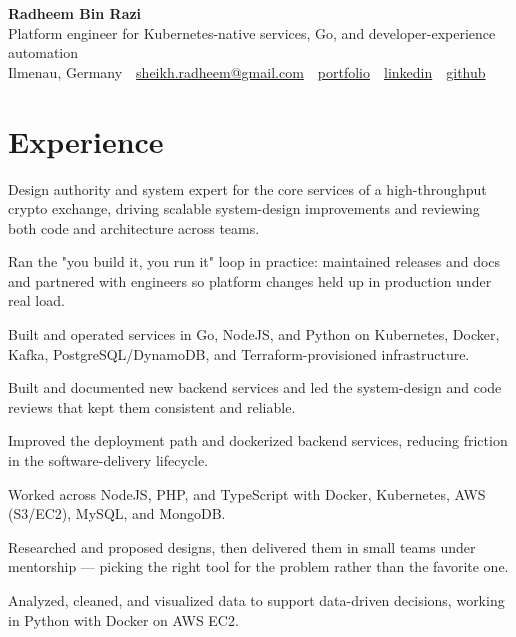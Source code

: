 \documentclass[11pt,a4paper]{resume}
\makeatletter
\newcommand{\Portfolio}{https://radheem.github.io/my-cv}
\newcommand{\PortfolioText}{portfolio}
\newcommand{\GitHub}{https://github.com/radheem}
\newcommand{\LinkedIn}{https://www.linkedin.com/in/radheem-razi}
\newcommand{\Email}{sheikh.radheem@gmail.com}
\makeatother
\begin{document}
\begin{center}
  {\huge\bfseries Radheem Bin Razi}\\[3pt]
  {\large Platform engineer for Kubernetes-native services, Go, and developer-experience automation}\\[6pt]
  \small
  Ilmenau, Germany \,\textbar\,
  \href{mailto:\Email}{\Email} \,\textbar\,
  \href{\Portfolio}{\PortfolioText} \,\textbar\,
  \href{\LinkedIn}{linkedin} \,\textbar\,
  \href{\GitHub}{github}
\end{center}
\vspace{2pt}

\section{Experience}

\bullets
  \item Design authority and system expert for the core services of a high-throughput crypto exchange, driving scalable system-design improvements and reviewing both code and architecture across teams.
  \item Ran the "you build it, you run it" loop in practice: maintained releases and docs and partnered with engineers so platform changes held up in production under real load.
  \item Built and operated services in Go, NodeJS, and Python on Kubernetes, Docker, Kafka, PostgreSQL/DynamoDB, and Terraform-provisioned infrastructure.
\bulletsend
\vspace{3pt}
\bullets
  \item Built and documented new backend services and led the system-design and code reviews that kept them consistent and reliable.
  \item Improved the deployment path and dockerized backend services, reducing friction in the software-delivery lifecycle.
  \item Worked across NodeJS, PHP, and TypeScript with Docker, Kubernetes, AWS (S3/EC2), MySQL, and MongoDB.
\bulletsend
\vspace{3pt}
\bullets
  \item Researched and proposed designs, then delivered them in small teams under mentorship — picking the right tool for the problem rather than the favorite one.
  \item Analyzed, cleaned, and visualized data to support data-driven decisions, working in Python with Docker on AWS EC2.
\bulletsend
\vspace{3pt}
\end{document}
